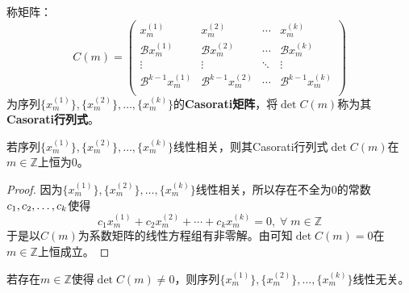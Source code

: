 \begin{definition}
	称矩阵：
	\begin{equation*}
		C(m)=
		\begin{pmatrix}
			x_m^{(1)} & x_m^{(2)} & \cdots & x_m^{(k)} \\
			\mathcal{B}x_m^{(1)} & \mathcal{B}x_m^{(2)} & \cdots & \mathcal{B}x_m^{(k)} \\
			\vdots & \vdots & \ddots & \vdots \\
			\mathcal{B}^{k-1}x_m^{(1)} & \mathcal{B}^{k-1}x_m^{(2)} & \cdots & \mathcal{B}^{k-1}x_m^{(k)} \\
		\end{pmatrix}
	\end{equation*}
	为序列$\{x_m^{(1)}\},\{x_m^{(2)}\},\dots,\{x_m^{(k)}\}$的\textbf{Casorati矩阵}，将$\det C(m)$称为其\textbf{Casorati行列式}。
\end{definition}
\begin{theorem}\label{theo:CasoratiEq0LinearDependent}
	若序列$\{x_m^{(1)}\},\{x_m^{(2)}\},\dots,\{x_m^{(k)}\}$线性相关，则其Casorati行列式$\det C(m)$在$m\in\mathbb{Z}$上恒为$0$。
\end{theorem}
\begin{proof}
	因为$\{x_m^{(1)}\},\{x_m^{(2)}\},\dots,\{x_m^{(k)}\}$线性相关，所以存在不全为$0$的常数$c_1, c_2, \dots, c_{k}$使得
	\begin{equation*}
		c_1x_m^{(1)}+c_2x_m^{(2)}+\cdots+c_kx_m^{(k)}=0,\;\forall\;m\in\mathbb{Z}
	\end{equation*}
	于是以$C(m)$为系数矩阵的线性方程组有非零解。由可知$\det C(m)=0$在$m\in\mathbb{Z}$上恒成立。
\end{proof}
\begin{corollary}\label{cor:CasoratiNe0LinearIndependent}
	若存在$m\in\mathbb{Z}$使得$\det C(m)\ne0$，则序列$\{x_m^{(1)}\},\{x_m^{(2)}\},\dots,\{x_m^{(k)}\}$线性无关。
\end{corollary}
